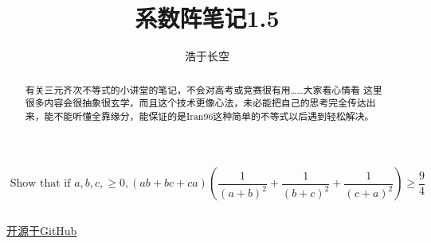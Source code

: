 \documentclass[UTF8]{ctexart}
\begin{document}
	

\title{系数阵笔记1.5}
\author{浩于长空}


\maketitle

$$\text { Show that if } a, b, c,\geq 0,(a b+b c+c a)\left(\frac{1}{(a+b)^{2}}+\frac{1}{(b+c)^{2}}+\frac{1}{(c+a)^{2}}\right) \geq \frac{9}{4}
$$
\begin{flushright}
\end{flushright}
\begin{displaymath}
\end{displaymath}

\begin{center}
	\href{https://github.com/Raymond0Hui/LaTeXwork-open}{开源于GitHub}
\end{center}

\begin{abstract}
	有关三元齐次不等式的小讲堂的笔记，不会对高考或竞赛很有用……大家看心情看
	这里很多内容会很抽象很玄学，而且这个技术更像心法，未必能把自己的思考完全传达出来，能不能听懂全靠缘分，能保证的是Iran96这种简单的不等式以后遇到轻松解决。
\end{abstract}

\newpage
\end{document}

